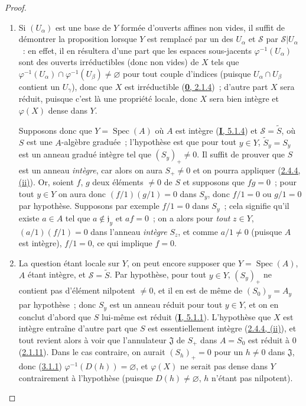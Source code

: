 \begin{proof}
\begin{enumerate}
  \item[\rm(i)] Si $(U_\alpha)$ est une base de $Y$ formée d'ouverts affines
    non vides, il suffit de démontrer la proposition lorsque $Y$ est remplacé
    par un des $U_\alpha$ et $\mathcal{S}$ par $\mathcal{S}|U_\alpha$~: en
    effet, il en résultera d'une part que les espaces sous-jacents
    $\varphi^{-1}(U_\alpha)$ sont des ouverts irréductibles (donc non vides)
    de $X$ tels que
    $\varphi^{-1}(U_\alpha)\cap\varphi^{-1}(U_\beta)\neq\varnothing$ pour tout
    couple d'indices (puisque $U_\alpha\cap U_\beta$ contient un $U_\gamma$),
    donc que $X$ est irréductible (\hyperref[0.2.1.4-fr]{\textbf{0}, 2.1.4})~; d'autre
    part $X$ sera réduit, puisque c'est là une propriété locale, donc $X$
    sera bien intègre et $\varphi(X)$ dense dans $Y$.

    Supposons donc que $Y=\operatorname{Spec}(A)$ où $A$ est intègre
    (\hyperref[I.5.1.4-fr]{\textbf{I}, 5.1.4}) et $\mathcal{S}=\widetilde{S}$, où $S$
    est une $A$-algèbre graduée~; l'hypothèse est que pour tout $y\in Y$,
    $\widetilde{S}_y=S_y$ est un anneau gradué intègre tel que
    $(S_y)_+\neq0$. Il suffit de prouver que $S$ est un anneau \emph{intègre},
    car alors on aura $S_+\neq0$ et on pourra appliquer
    (\hyperref[II.2.4.4-fr]{2.4.4, (ii)}). Or, soient $f$, $g$ deux éléments
    $\neq0$ de $S$ et supposons que $fg=0$~; pour tout $y\in Y$ on aura donc
    $(f/1)(g/1)=0$ dans $S_y$, donc $f/1=0$ ou $g/1=0$ par hypothèse.
    Supposons par exemple $f/1=0$ dans $S_y$~; cela signifie qu'il existe
    $a\in A$ tel que $a\notin\mathfrak{j}_y$ et $af=0$~; on a alors pour \emph{tout}
    $z\in Y$, $(a/1)(f/1)=0$ dans l'anneau \emph{intègre} $S_z$, et comme
    $a/1\neq0$ (puisque $A$ est intègre), $f/1=0$, ce qui implique $f=0$.
  \item[\rm(ii)] La question étant locale sur $Y$, on peut encore supposer
    que $Y=\operatorname{Spec}(A)$, $A$ étant intègre, et
    $\mathcal{S}=\widetilde{S}$. Par hypothèse, pour tout $y\in Y$, $(S_y)_+$
    ne contient pas d'élément nilpotent $\neq0$, et il en est de même de
    $(S_0)_y=A_y$ par hypothèse~; donc $S_y$ est un anneau réduit pour tout
    $y\in Y$, et on en conclut d'abord que $S$ lui-même est réduit
    (\hyperref[I.5.1.1-fr]{\textbf{I}, 5.1.1}). L'hypothèse que $X$ est intègre
    entraîne d'autre part que $S$ est essentiellement intègre
    (\hyperref[II.2.4.4-fr]{2.4.4, (ii)}), et tout revient alors à voir que
    l'annulateur $\mathfrak{J}$ de $S_+$ dans $A=S_0$ est réduit
    à $0$
    (\hyperref[II.2.1.11-fr]{2.1.11}). Dans le cas contraire, on aurait
    $(S_h)_+=0$ pour un $h\neq0$ dans $\mathfrak{J}$, donc
    (\hyperref[II.3.1.1-fr]{3.1.1}) $\varphi^{-1}(D(h))=\varnothing$, et
    $\varphi(X)$ ne serait pas dense dans $Y$ contrairement à l'hypothèse
    (puisque $D(h)\neq\varnothing$, $h$ n'étant pas nilpotent).
\end{enumerate}
\end{proof}

